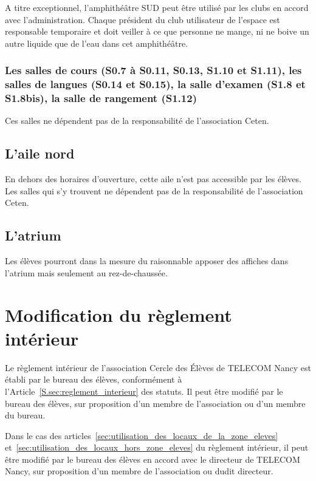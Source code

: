\documentclass{article} %
\begin{document}
				A titre exceptionnel, l’amphithéâtre SUD peut être utilisé par
				les clubs en accord avec l’administration. Chaque président du
				club utilisateur de l’espace est responsable temporaire et doit
				veiller à ce que personne ne mange, ni ne boive un autre
				liquide que de l’eau dans cet amphithéâtre.

			\subsubsection{Les salles de cours (S0.7 à S0.11, S0.13, S1.10 et
			S1.11), les salles de langues (S0.14 et S0.15), la salle d'examen
			(S1.8 et S1.8bis), la salle de rangement (S1.12)}
\label{ssub:les_salles_de_cours_s0_7_a_s0_11_s0_13_s1_10_et_s1_11_les_salles_de_langues_s0_14_et_s0_15_la_salle_d_examen_s1_8_et_s1_8bis_la_salle_de_rangement_s1_12_}

				Ces salles ne dépendent pas de la responsabilité de
				l'association Ceten.

		\subsection{L'aile nord}
\label{sub:l_aile_nord}

			En dehors des horaires d’ouverture, cette aile n’est pas accessible
			par les élèves. Les salles qui s’y trouvent ne dépendent pas de la
			responsabilité de l'association Ceten.

		\subsection{L'atrium}
\label{sub:l_atrium}

			Les élèves pourront dans la mesure du raisonnable apposer des
			affiches dans l’atrium mais seulement au rez-de-chaussée.

	\section{Modification du règlement intérieur}
\label{sec:modification_du_reglement_interieur}

		Le règlement intérieur de l’association Cercle des Élèves de TELECOM
		Nancy est établi par le bureau des élèves, conformément à
		l'Article~\ref{S.sec:reglement_interieur} des statuts. Il peut être
		modifié par le bureau des élèves, sur proposition d’un membre de
		l’association ou d’un membre du bureau.

		Dans le cas des
		articles~\ref{sec:utilisation_des_locaux_de_la_zone_eleves}
		et~\ref{sec:utilisation_des_locaux_hors_zone_eleves} du règlement
		intérieur, il peut être modifié par le bureau des élèves en accord avec
		le directeur de TELECOM Nancy, sur proposition d’un membre de
		l’association ou dudit directeur.
\end{document}
